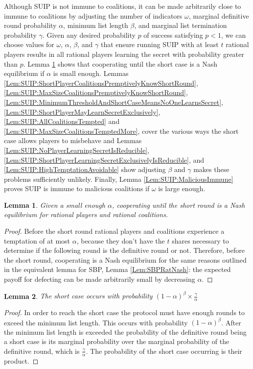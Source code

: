 \documentclass{dalcsthesis}
\newtheorem{lemma}{Lemma}
\begin{document}
Although SUIP is not immune to coalitions, it can be made arbitrarily close to immune to coalitions by adjusting the number of indicators $\omega$, marginal definitive round probability $\alpha$, minimum list length $\beta$, and marginal list termination probability $\gamma$. Given any desired probability $p$ of success satisfying $p < 1$, we can choose values for $\omega$, $\alpha$, $\beta$, and $\gamma$ that ensure running SUIP with at least $t$ rational players results in all rational players learning the secret with probability greater than $p$. Lemma \ref{Lem:SUIP:RatNashCoop} shows that cooperating until the short case is a Nash equilibrium if $\alpha$ is small enough. Lemmas \ref{Lem:SUIP:ShortPlayerCoalitionsPremptivelyKnowShortRound}, \ref{Lem:SUIP:MaxSizeCoalitionsPremptivelyKnowShortRound}, \ref{Lem:SUIP:MinimumThresholdAndShortCaseMeansNoOneLearnsSecret}, \ref{Lem:SUIP:ShortPlayerMayLearnSecretExclusively}, \ref{Lem:SUIP:AllCoalitionsTempted} and \ref{Lem:SUIP:MaxSizeCoalitionsTemptedMore}, cover the various ways the short case allows players to misbehave and Lemmas \ref{Lem:SUIP:NoPlayerLearningSecretIsReducible}, \ref{Lem:SUIP:ShortPlayerLearningSecretExclusivelyIsReducible}, and \ref{Lem:SUIP:HighTemptationAvoidable} show adjusting $\beta$ and $\gamma$ makes these problems sufficiently unlikely. Finally, Lemma \ref{Lem:SUIP:MaliciousImmune} proves SUIP is immune to malicious coalitions if $\omega$ is large enough.

\begin{lemma} Given a small enough $\alpha$, cooperating until the short round is a Nash equilibrium for rational players and rational coalitions. \label{Lem:SUIP:RatNashCoop} \end{lemma}
\begin{proof}
Before the short round rational players and coalitions experience a temptation of at most $\alpha$, because they don't have the $t$ shares necessary to determine if the following round is the definitive round or not. Therefore, before the short round, cooperating is a Nash equilibrium for the same reasons outlined in the equivalent lemma for SBP, Lemma \ref{Lem:SBPRatNash}: the expected payoff for defecting can be made arbitrarily small by decreasing $\alpha$.  
\end{proof}

\begin{lemma} The short case occurs with probability $(1-\alpha)^\beta \times \frac{\gamma}{\alpha}$ \label{Lem:SUIP:ChanceOfShortCase} \end{lemma}
\begin{proof}
In order to reach the short case the protocol must have enough rounds to exceed the minimum list length. This occurs with probability $(1-\alpha)^\beta$. After the minimum list length is exceeded the probability of the definitive round being a short case is its marginal probability over the marginal probability of the definitive round, which is $\frac{\gamma}{\alpha}$. The probability of the short case occurring is their product.
\end{proof}
\end{document}
